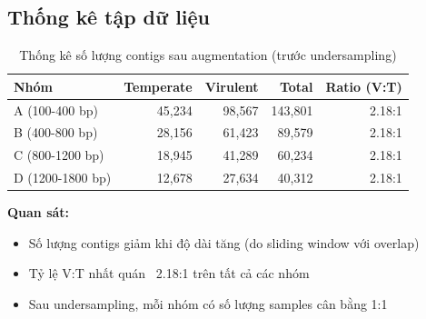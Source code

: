 \subsection{Thống kê tập dữ liệu}

\begin{table}[h]
\centering
\caption{Thống kê số lượng contigs sau augmentation (trước undersampling)}
\label{tab:dataset_stats}
\begin{tabular}{lrrrr}
\toprule
\textbf{Nhóm} & \textbf{Temperate} & \textbf{Virulent} & \textbf{Total} & \textbf{Ratio (V:T)} \\
\midrule
A (100-400 bp) & 45,234 & 98,567 & 143,801 & 2.18:1 \\
B (400-800 bp) & 28,156 & 61,423 & 89,579 & 2.18:1 \\
C (800-1200 bp) & 18,945 & 41,289 & 60,234 & 2.18:1 \\
D (1200-1800 bp) & 12,678 & 27,634 & 40,312 & 2.18:1 \\
\bottomrule
\end{tabular}
\end{table}

\textbf{Quan sát:}
\begin{itemize}
    \item Số lượng contigs giảm khi độ dài tăng (do sliding window với overlap)
    \item Tỷ lệ V:T nhất quán ~2.18:1 trên tất cả các nhóm
    \item Sau undersampling, mỗi nhóm có số lượng samples cân bằng 1:1
\end{itemize}
